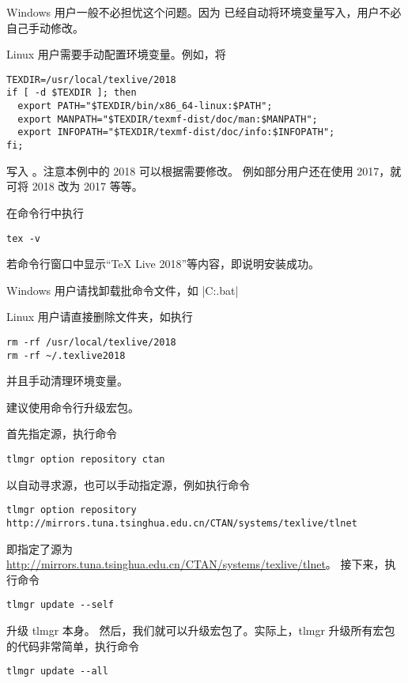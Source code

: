 
Windows 用户一般不必担忧这个问题。因为 \TeXLive{} 已经自动将环境变量写入，用户不必自己手动修改。

Linux 用户需要手动配置环境变量。例如，将
\begin{verbatim}
TEXDIR=/usr/local/texlive/2018
if [ -d $TEXDIR ]; then
  export PATH="$TEXDIR/bin/x86_64-linux:$PATH";
  export MANPATH="$TEXDIR/texmf-dist/doc/man:$MANPATH";
  export INFOPATH="$TEXDIR/texmf-dist/doc/info:$INFOPATH";
fi;
\end{verbatim}
写入 。注意本例中的 2018 可以根据需要修改。
例如部分用户还在使用 \TeXLive{} 2017，就可将 2018 改为 2017 等等。



在命令行中执行
\begin{verbatim}
tex -v
\end{verbatim}
若命令行窗口中显示“TeX Live 2018”等内容，即说明安装成功。



Windows 用户请找卸载批命令文件，如 |C:\texlive{}\tlpkg\installer\uninst.bat|

Linux 用户请直接删除文件夹，如执行
\begin{verbatim}
rm -rf /usr/local/texlive/2018
rm -rf ~/.texlive2018
\end{verbatim}
并且手动清理环境变量。



建议使用命令行升级宏包。

首先指定源，执行命令
\begin{verbatim}
tlmgr option repository ctan
\end{verbatim}
以自动寻求源，也可以手动指定源，例如执行命令
\begin{verbatim}
tlmgr option repository http://mirrors.tuna.tsinghua.edu.cn/CTAN/systems/texlive/tlnet
\end{verbatim}
即指定了源为 \url{http://mirrors.tuna.tsinghua.edu.cn/CTAN/systems/texlive/tlnet}。
接下来，执行命令
\begin{verbatim}
tlmgr update --self
\end{verbatim}

升级 tlmgr 本身。 然后，我们就可以升级宏包了。实际上，tlmgr
升级所有宏包的代码非常简单，执行命令
\begin{verbatim}
tlmgr update --all
\end{verbatim}

